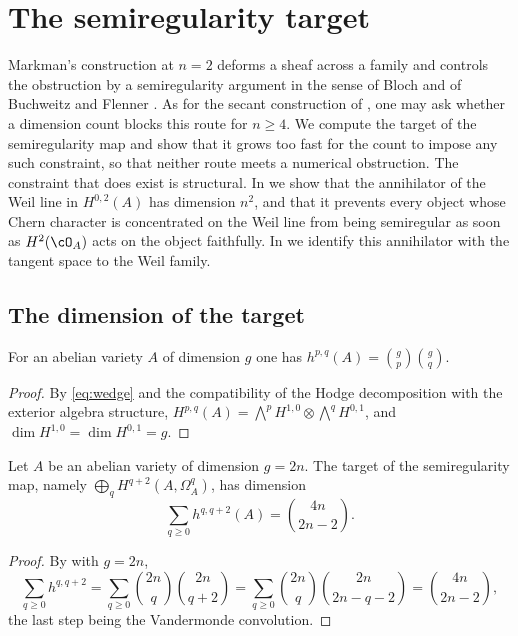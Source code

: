 \section{The semiregularity target}\label{sec:semireg}

Markman's construction at $n=2$ deforms a sheaf across a family and controls
the obstruction by a semiregularity argument in the sense of Bloch and of
Buchweitz and Flenner \cite{Blo72,BF03}. As for the secant construction of
, one may ask whether a dimension count blocks this route
for $n\ge4$. We compute the target of the semiregularity map and show that it
grows too fast for the count to impose any such constraint, so that neither
route meets a numerical obstruction. The constraint that does exist is
structural. In  we show that the annihilator of the Weil
line in $H^{0,2}(A)$ has dimension $n^{2}$, and that it prevents every object
whose Chern character is concentrated on the Weil line from being
semiregular as soon as $H^{2}(\cO_{A})$ acts on the object faithfully. In
 we identify this annihilator with the tangent space to the
Weil family.

\subsection{The dimension of the target}

\begin{lemma}\label{lem:hodgenumbers}
For an abelian variety $A$ of dimension $g$ one has
$h^{p,q}(A)=\binom{g}{p}\binom{g}{q}$.
\end{lemma}

\begin{proof}
By \eqref{eq:wedge} and the compatibility of the Hodge decomposition with the
exterior algebra structure,
$H^{p,q}(A)=\bigwedge^{p}H^{1,0}\otimes\bigwedge^{q}H^{0,1}$, and
$\dim H^{1,0}=\dim H^{0,1}=g$.
\end{proof}

\begin{proposition}\label{prop:target}
Let $A$ be an abelian variety of dimension $g=2n$. The target of the
semiregularity map, namely $\bigoplus_{q}H^{q+2}(A,\Omega^{q}_{A})$, has
dimension
\[
  \sum_{q\ge0}h^{q,q+2}(A)=\binom{4n}{2n-2}.
\]
\end{proposition}

\begin{proof}
By  with $g=2n$,
\[
  \sum_{q\ge0}h^{q,q+2}
  =\sum_{q\ge0}\binom{2n}{q}\binom{2n}{q+2}
  =\sum_{q\ge0}\binom{2n}{q}\binom{2n}{2n-q-2}
  =\binom{4n}{2n-2},
\]
the last step being the Vandermonde convolution.
\end{proof}


